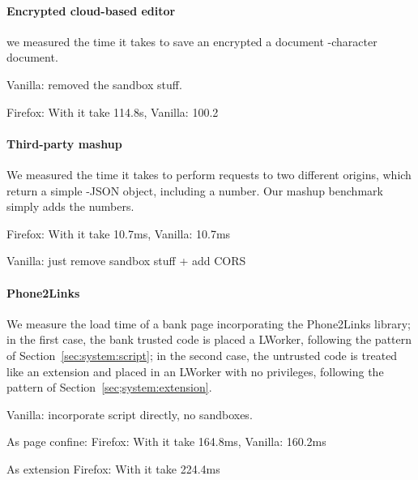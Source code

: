 \paragraph{Encrypted cloud-based editor}
%
we measured the time it takes to save an encrypted a document
-character document.

Vanilla: removed the sandbox stuff.

Firefox: With \sys{} it take 114.8s, Vanilla: 100.2

\paragraph{Third-party mashup}

We measured the time it takes to perform requests to two different origins,
which return a simple -JSON object, including a number.
%
Our mashup benchmark simply adds the numbers.


Firefox: With \sys{} it take 10.7ms, Vanilla:  10.7ms

Vanilla: just remove sandbox stuff + add CORS

\paragraph{Phone2Links}

We measure the load time of a bank page incorporating the Phone2Links library;
in the first case, the bank trusted code is placed a LWorker, following the
pattern of Section~\ref{sec:system:script}; in the second case, the untrusted
code is treated like an extension and placed in an LWorker with no privileges,
following the pattern of Section~\ref{sec;system:extension}.

Vanilla: incorporate script directly, no sandboxes.


As page confine:
Firefox: With \sys{} it take 164.8ms, Vanilla:  160.2ms

As extension
Firefox: With \sys{} it take 224.4ms
